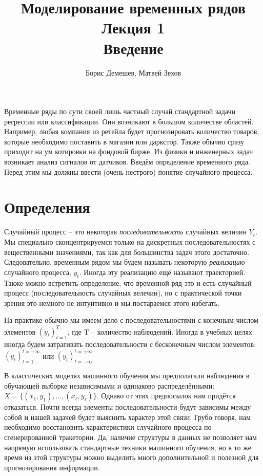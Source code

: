 \documentclass[12pt,fleqn]{article}
\begin{document}
\title{Моделирование временных рядов\\Лекция 1\\Введение}
\author{Борис Демешев, Матвей Зехов}
\date{}
\maketitle

Временные ряды по сути своей лишь частный случай стандартной задачи регрессии или классификации. Они возникают в большом количестве областей. Например, любая компания из ретейла будет прогнозировать количество товаров, которые необходимо поставить в магазин или даркстор. Также обычно сразу приходит на ум котировки на фондовой бирже. Из физики и инженерных задач возникает анализ  сигналов от датчиков. Введём определение временного ряда. Перед этим мы должны ввести (очень нестрого) понятие случайного процесса.

\section{Определения}

Случайный процесс -- это некоторая \emph{последовательность} случайных величин $Y_t$. Мы специально сконцентрируемся только на дискретных последовательностях с вещественными значениями, так как для большинства задач этого достаточно. Следовательно, временным рядом мы будем называть некоторую \emph{реализацию} случайного процесса, $y_t$. Иногда эту реализацию ещё называют траекторией. Также можно встретить определение, что временной ряд это и есть случайный процесс (последовательность случайных велечин), но с практической точки зрения это немного не интуитивно и мы постараемся этого избегать.

На практике обычно мы имеем дело с последовательностями с конечным числом элементов $(y_t)_{t=1}^{T}$, где T -- количество наблюдений. Иногда в учебных целях иногда будем затрагивать последовательности с бесконечным числом элементов: $(y_t)_{t=1}^{t=+\infty}$ или $(y_t)_{t=-\infty}^{t=+\infty}$

В классических моделях машинного обучения мы предполагали наблюдения в обучающей выборке независимыми и одинаково распределёнными: $X = \{(x_1, y_1), \dots, (x_\ell, y_\ell)\}$. Однако от этих предпосылок нам придётся отказаться. Почти всегда элементы последовательности будут зависимы между собой и нашей задачей будет выяснить характер этой связи. Грубо говоря, нам необходимо восстановить характеристики случайного процесса по сгенерированной тракетории. Да, наличие структуры в данных не позволяет нам напрямую использовать стандартные техники машинного обучения, но в то же время из этой структуры можно выделить много дополнительной и полезной для прогнозирования информации.
\end{document}
